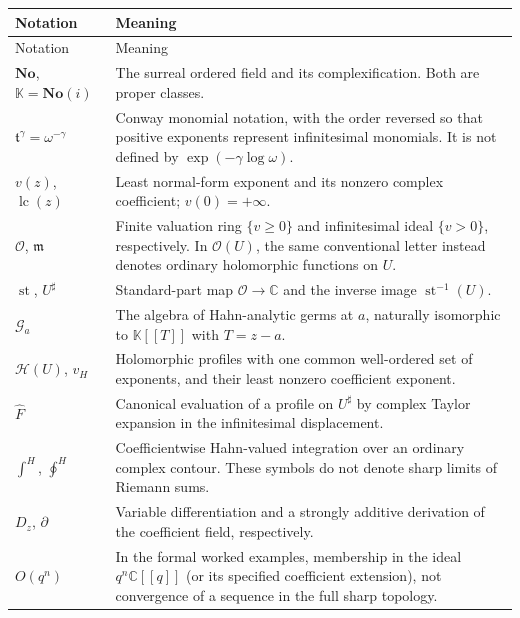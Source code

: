 \documentclass[11pt,a4paper]{article}
\numberwithin{equation}{section}
\theoremstyle{definition}
\newcommand{\No}{\mathbf{No}}
\newcommand{\K}{\mathbb K}
\newcommand{\C}{\mathbb C}
\newcommand{\tmon}{\mathfrak t}
\newcommand{\OO}{\mathcal O}
\newcommand{\mm}{\mathfrak m}
\newcommand{\HH}{\mathscr H}
\newcommand{\GG}{\mathscr G}
\newcommand{\st}{\operatorname{st}}
\newcommand{\lc}{\operatorname{lc}}
\newcommand{\hhat}[1]{\widehat{#1}}
\newcommand{\hint}{\int^{\!H}}
\newcommand{\hoint}{\oint^{\!H}}
\newcommand{\vprof}{v_{\!H}}
\begin{document}
\renewcommand{\arraystretch}{1.16}
\begin{longtable}{@{}>{\raggedright\arraybackslash}p{}p{}@{}}
\toprule
Notation & Meaning\\
\midrule
\endfirsthead
\toprule
Notation & Meaning\\
\midrule
\endhead
$\No$, $\K=\No(i)$ & The surreal ordered field and its complexification.
Both are proper classes.\\
$\tmon^\gamma=\omega^{-\gamma}$ & Conway monomial notation, with the order
reversed so that positive exponents represent infinitesimal monomials.
It is not defined by $\exp(-\gamma\log\omega)$.\\
$v(z)$, $\lc(z)$ & Least normal-form exponent and its nonzero complex
coefficient; $v(0)=+\infty$.\\
$\OO$, $\mm$ & Finite valuation ring $\{v\geq0\}$ and infinitesimal
ideal $\{v>0\}$, respectively. In $\OO(U)$, the same conventional letter
instead denotes ordinary holomorphic functions on $U$.\\
$\st$, $U^\sharp$ & Standard-part map $\OO\to\C$ and the inverse image
$\st^{-1}(U)$.\\
$\GG_a$ & The algebra of Hahn-analytic germs at $a$, naturally isomorphic
to $\K[[T]]$ with $T=z-a$.\\
$\HH(U)$, $\vprof$ & Holomorphic profiles with one common well-ordered
set of exponents, and their least nonzero coefficient exponent.\\
$\hhat F$ & Canonical evaluation of a profile on $U^\sharp$ by complex
Taylor expansion in the infinitesimal displacement.\\
$\hint$, $\hoint$ & Coefficientwise Hahn-valued integration over an
ordinary complex contour. These symbols do not denote sharp limits of
Riemann sums.\\
$D_z$, $\partial$ & Variable differentiation and a strongly additive
derivation of the coefficient field, respectively.\\
$O(q^n)$ & In the formal worked examples, membership in the ideal
$q^n\C[[q]]$ (or its specified coefficient extension), not convergence
of a sequence in the full sharp topology.\\
\bottomrule
\end{longtable}
\renewcommand{\arraystretch}{1}
\end{document}
